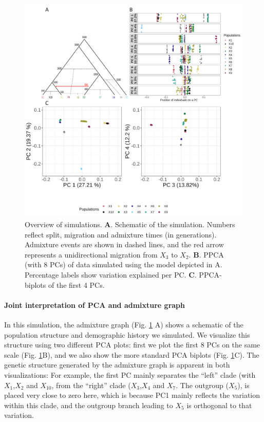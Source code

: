 \documentclass[12pt, letterpaper]{article}
\begin{document}
\begin{figure}[ht!]
    \includegraphics[width=16.5cm]{ppt/sim_final.png}
    \centering
    \caption{Overview of simulations. \textbf{A}. Schematic of the simulation. Numbers reflect split, migration and admixture times (in generations). Admixture events are shown in dashed lines, and the red arrow represents a unidirectional migration from $X_3$ to $X_2$. \textbf{B}. PPCA (with 8 PCs) of data simulated using the model depicted in A.  Percentage labels show variation explained per PC. \textbf{C}. PPCA-biplots of the first 4 PCs.
}
    \label{fig2:sim}
\end{figure}

\paragraph{Joint interpretation of PCA and admixture graph}
In this simulation, the admixture graph (Fig. \ref{fig2:sim} A) shows a schematic of the population structure and demographic history we simulated.  We visualize this structure using two different PCA plots: first we plot the first 8 PCs on the same scale (Fig. \ref{fig2:sim}B), and we also show the more standard PCA biplots (Fig. \ref{fig2:sim}C). The genetic structure generated by the admixture graph is apparent in both visualizations: For example, the first PC mainly separates  the ``left'' clade (with $X_1$,$X_2$ and $X_10$, from the ``right'' clade ($X_3$,$X_4$ and $X_7$. The outgroup ($X_5$), is placed very close to zero here, which is because PC1 mainly reflects the variation within this clade, and the outgroup branch leading to $X_5$ is orthogonal to that variation. 
\end{document}
